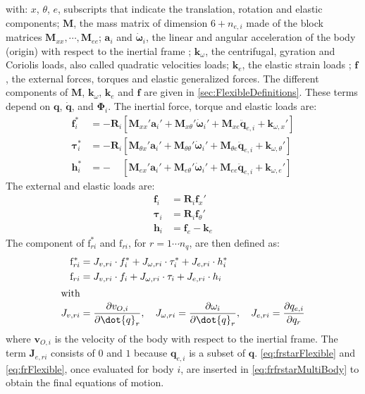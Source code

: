 \documentclass[wes, manuscript]{copernicus}
\renewcommand{\v}[1]{\boldsymbol{#1}}
\newcommand{\m}[1]{\boldsymbol{#1}}
\newcommand{\kanef}{\mathrm{f}}
\begin{document}
with: $x$, $\theta$, $e$, subscripts that indicate the translation, rotation and elastic components; $\m{M}$,  the mass matrix of dimension $6+n_{e,i}$ made of the block matrices $\m{M}_{xx},\cdots,\m{M}_{ee}$; $\v{a}_i$ and $\v{\dot{\omega}}_i$, the linear and angular acceleration of the body (origin) with respect to the inertial frame ; $\v{k}_\omega$, the centrifugal, gyration and Coriolis loads, also called quadratic velocities loads; $\v{k}_e$, the elastic strain loads ; $\v{f}$, the external forces, torques and elastic generalized forces.
The different components of $\m{M}$, $\m{k}_\omega$,  $\m{k}_e$ and $\v{f}$ are given in \autoref{sec:FlexibleDefinitions}.  These terms depend on $\v{q}$, $\v{\dot{q}}$, and $\v{\Phi}_i$.
% 
The inertial force, torque and elastic loads are:
\begin{align}
   \v{f}_{i}^* &= -\m{R}_i\left[\m{M}_{xx}'\v{a}_i' + \m{M}_{x\theta}'\v{\dot{\omega}}_i'  + \m{M}_{xe} \v{\ddot{q}}_{e,i}   + \v{k}_{\omega,x}'     \right]\\
   \v{\tau}_{i}^* &= -\m{R}_i\left[\m{M}_{\theta x}'\v{a}_i' + \m{M}_{\theta \theta}'\v{\dot{\omega}}_i'  + \m{M}_{\theta  e} \v{\ddot{q}}_{e,i}   + \v{k}_{\omega,\theta }'     \right]\\
   \v{h}_{i}^* &= - \phantom{\m{R}_i}      \left[\m{M}_{e x}'\v{a}_i' + \m{M}_{e \theta}'\v{\dot{\omega}}_i'  + \m{M}_{e  e} \v{\ddot{q}}_{e,i}   + \v{k}_{\omega,e }'     \right]
\end{align}
The external and elastic loads are:
\begin{align}
   \v{f}_{i} &= \m{R}_i\v{f}_x'\\
   \v{\tau}_{i} &= \m{R}_i\v{f}_\theta'\\
   \v{h}_{i} &=\v{f}_{e} - \v{k}_{e} 
\end{align}
The component of $\kanef_{ri}^*$ and $\kanef_{ri}$, for $r=1\cdots n_q$, are then defined as:
\begin{align}
   \kanef_{ri}^* &= 
       \v{J}_{v,ri} \cdot \v{f}_i^*  + \v{J}_{\omega,ri} \cdot \v{\tau}_i^*
     + \v{J}_{e,ri} \cdot \v{h}_i^*
    \label{eq:frstarFlexible}
     \\
   \kanef_{ri} &= 
       \v{J}_{v,ri} \cdot \v{f}_i  + \v{J}_{\omega,ri} \cdot \v{\tau}_i
     + \v{J}_{e,ri} \cdot \v{h}_i
    \label{eq:frFlexible}
     \\
     \intertext{with}
    \v{J}_{v,ri} &= \frac{\partial \v{v}_{O,i}}{\partial \dot{q}_r}
    ,\quad
    \v{J}_{\omega,ri} = \frac{\partial \v{\omega}_{i}}{\partial \dot{q}_r}
    ,\quad
    \v{J}_{e,ri} = \frac{\partial \v{q}_{e,i}}{\partial q_r}
    \label{eq:Jacobians}
\end{align}
where $\v{v}_{O,i}$ is the velocity of the body with respect to the inertial frame.
The term $\v{J}_{e,ri}$ consists of $0$ and $1$ because $\v{q}_{e,i}$ is a subset of $\v{q}$.
\autoref{eq:frstarFlexible} and \autoref{eq:frFlexible}, once evaluated for body $i$,
are inserted in \autoref{eq:frfrstarMultiBody} to obtain the final equations of motion.
\end{document}
